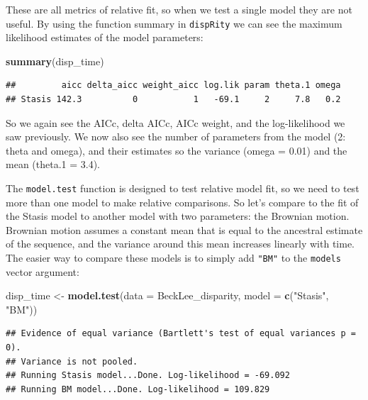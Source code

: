 \documentclass[]{book}
\newenvironment{Shaded}{\begin{snugshade}}{\end{snugshade}}
\newcommand{\DataTypeTok}[1]{\textcolor[rgb]{0.13,0.29,0.53}{#1}}
\newcommand{\KeywordTok}[1]{\textcolor[rgb]{0.13,0.29,0.53}{\textbf{#1}}}
\newcommand{\NormalTok}[1]{#1}
\newcommand{\StringTok}[1]{\textcolor[rgb]{0.31,0.60,0.02}{#1}}
\begin{document}
These are all metrics of relative fit, so when we test a single model they are not useful.
By using the function summary in \texttt{dispRity} we can see the maximum likelihood estimates of the model parameters:

\begin{Shaded}
\begin{Highlighting}[]
\KeywordTok{summary}\NormalTok{(disp_time)}
\end{Highlighting}
\end{Shaded}

\begin{verbatim}
##         aicc delta_aicc weight_aicc log.lik param theta.1 omega
## Stasis 142.3          0           1   -69.1     2     7.8   0.2
\end{verbatim}

So we again see the AICc, delta AICc, AICc weight, and the log-likelihood we saw previously.
We now also see the number of parameters from the model (2: theta and omega), and their estimates so the variance (omega = 0.01) and the mean (theta.1 = 3.4).

The \texttt{model.test} function is designed to test relative model fit, so we need to test more than one model to make relative comparisons.
So let's compare to the fit of the Stasis model to another model with two parameters: the Brownian motion.
Brownian motion assumes a constant mean that is equal to the ancestral estimate of the sequence, and the variance around this mean increases linearly with time.
The easier way to compare these models is to simply add \texttt{"BM"} to the \texttt{models} vector argument:

\begin{Shaded}
\begin{Highlighting}[]
\NormalTok{disp_time <-}\StringTok{ }\KeywordTok{model.test}\NormalTok{(}\DataTypeTok{data =}\NormalTok{ BeckLee_disparity,}
                        \DataTypeTok{model =} \KeywordTok{c}\NormalTok{(}\StringTok{"Stasis"}\NormalTok{, }\StringTok{"BM"}\NormalTok{))}
\end{Highlighting}
\end{Shaded}

\begin{verbatim}
## Evidence of equal variance (Bartlett's test of equal variances p = 0).
## Variance is not pooled.
## Running Stasis model...Done. Log-likelihood = -69.092
## Running BM model...Done. Log-likelihood = 109.829
\end{verbatim}
\end{document}
